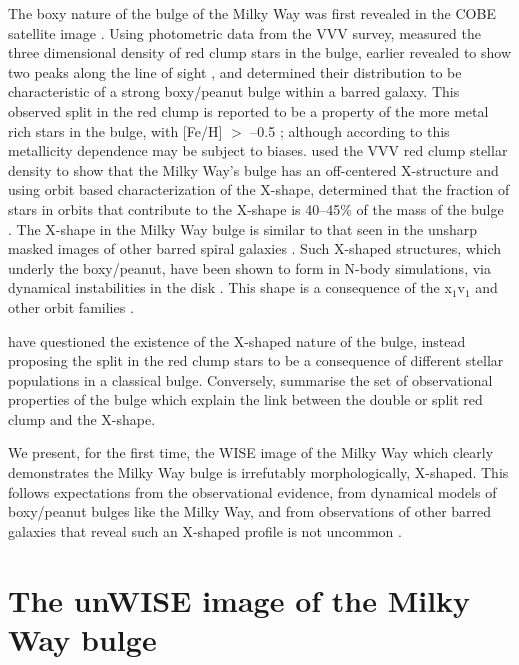 \documentclass[12pt, preprint]{aastex}
\begin{document}
The boxy nature of the bulge of the Milky Way was first revealed in
the COBE satellite image \citep{Dwek1995}. Using photometric data from
the VVV survey, \citet{Wegg2013} measured the three dimensional
density of red clump stars in the bulge, earlier revealed to show two
peaks along the line of sight \citep{McWilliam2010, Nataf2010}, and
determined their distribution to be characteristic of a strong
boxy/peanut bulge within a barred galaxy. This observed split in the
red clump is reported to be a property of the more metal rich stars in
the bulge, with [Fe/H] $>$ --0.5 \citep{Ness2012, Uttenthaler2012};
although according to \citet{Nataf2014} this metallicity dependence
may be subject to biases.  \citet{Portail2015a} used the VVV red clump
stellar density to show that the Milky Way's bulge has an off-centered
X-structure and using orbit based characterization of the
X-shape, determined that the fraction of stars in orbits that
contribute to the X-shape is 40--45\% of the mass of the bulge
\citep{Portail2015b}. The X-shape in the Milky Way bulge is similar to
that seen in the unsharp masked images of other barred spiral galaxies
\citep[e.g.][]{Bureau2006}. Such X-shaped structures, which underly
the boxy/peanut, have been shown to form in N-body simulations, via
dynamical instabilities in the disk \citep[e.g.][]{Athanassoula2005,
  Debattista2006, Inma2006}. This shape is a consequence of the
x$_{1}$v$_{1}$ \citep{P1984, Athanassoula1992} and other orbit
families \citep[e.g.][]{Portail2015b}.

\citet{Lee2015} have questioned the existence of the X-shaped nature of the bulge, instead proposing the split in the red clump stars to be a consequence of different stellar populations in a classical bulge. Conversely,  \citet{Gonzalez2015} summarise the set of observational properties of the bulge which explain the link between the double or split red clump and the X-shape.


 We present, for the first time, the WISE image of the Milky Way \citep{Lang2014a} which clearly demonstrates the Milky Way bulge is irrefutably morphologically, X-shaped. This follows expectations from the observational evidence,  from dynamical models of boxy/peanut bulges like the Milky Way, and from observations of other barred galaxies that reveal such an X-shaped profile is not uncommon \citep{L2014}. 

\section{The unWISE image of the Milky Way bulge}
\end{document}
